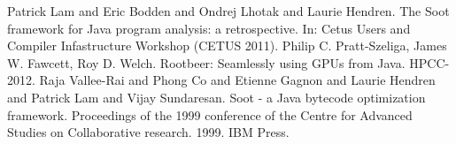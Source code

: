 \documentclass[preprint]{sigplanconf}
\begin{document}
\begin{thebibliography}{}
\softraggedright

 Patrick Lam and Eric Bodden and Ondrej Lhotak and Laurie Hendren. The Soot framework for Java program analysis: a retrospective. In: Cetus Users and Compiler Infastructure Workshop (CETUS 2011).
 Philip C. Pratt-Szeliga, James W. Fawcett, Roy D. Welch. Rootbeer: Seamlessly using GPUs from Java. HPCC-2012.
 Raja Vallee-Rai and Phong Co and Etienne Gagnon and Laurie Hendren and Patrick Lam and Vijay Sundaresan. Soot - a Java bytecode optimization framework. Proceedings of the 1999 conference of the Centre for Advanced Studies on Collaborative research. 1999. IBM Press.

\end{thebibliography}
\end{document}

